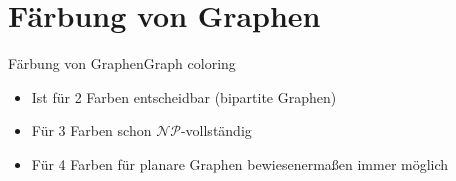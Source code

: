 \section{Färbung von Graphen}
\begin{frame}{Färbung von Graphen}{Graph coloring}
	\begin{itemize}
		\item Ist für 2 Farben entscheidbar (bipartite Graphen)
		\item Für 3 Farben schon $\mathcal{NP}$-vollständig
		\item Für 4 Farben für planare Graphen bewiesenermaßen immer möglich
	\end{itemize}
\end{frame}
